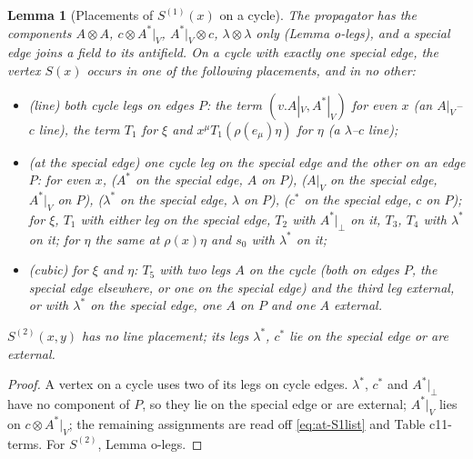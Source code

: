 \documentclass[11pt]{article}
\numberwithin{equation}{section}
\theoremstyle{plain}
\newtheorem{lemma}[theorem]{Lemma}
\theoremstyle{definition}
\newcommand{\AV}{A|_V}
\begin{document}
\begin{lemma}[Placements of $S^{(1)}(x)$ on a cycle]
\label{lem:at-place}
The propagator has the components $A\otimes A$, $c\otimes A^*|_V$, $A^*|_V\otimes c$, $\lambda\otimes\lambda$ only (Lemma o-legs), and a special edge joins a field to its antifield. On a cycle with exactly one special edge, the vertex $S(x)$ occurs in one of the following placements, and in no other:
\begin{itemize}
\item (line) both cycle legs on edges $P$: the term $(v.\AV,A^*|_V)$ for even $x$ (an $\AV$--$c$ line), the term $T_1$ for $\xi$ and $x^\mu T_1(\rho(e_\mu)\eta)$ for $\eta$ (a $\lambda$--$c$ line);
\item (at the special edge) one cycle leg on the special edge and the other on an edge $P$: for even $x$, ($A^*$ on the special edge, $A$ on $P$), ($\AV$ on the special edge, $A^*|_V$ on $P$), ($\lambda^*$ on the special edge, $\lambda$ on $P$), ($c^*$ on the special edge, $c$ on $P$); for $\xi$, $T_1$ with either leg on the special edge, $T_2$ with $A^*|_\perp$ on it, $T_3$, $T_4$ with $\lambda^*$ on it; for $\eta$ the same at $\rho(x)\eta$ and $s_0$ with $\lambda^*$ on it;
\item (cubic) for $\xi$ and $\eta$: $T_5$ with two legs $A$ on the cycle (both on edges $P$, the special edge elsewhere, or one on the special edge) and the third leg external, or with $\lambda^*$ on the special edge, one $A$ on $P$ and one $A$ external.
\end{itemize}
$S^{(2)}(x,y)$ has no line placement; its legs $\lambda^*$, $c^*$ lie on the special edge or are external.
\end{lemma}

\begin{proof}
A vertex on a cycle uses two of its legs on cycle edges. $\lambda^*$, $c^*$ and $A^*|_\perp$ have no component of $P$, so they lie on the special edge or are external; $A^*|_V$ lies on $c\otimes A^*|_V$; the remaining assignments are read off \eqref{eq:at-S1list} and Table c11-terms. For $S^{(2)}$, Lemma o-legs.
\end{proof}
\end{document}
